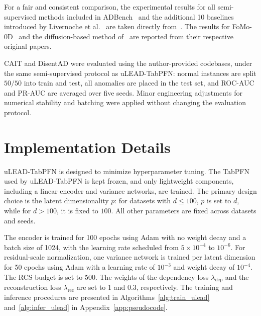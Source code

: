 \documentclass[conference]{IEEEtran}
\begin{document}
	For a fair and consistent comparison, the experimental results for all semi-supervised methods included in ADBench~\cite{han2022adbench} and the additional 10 baselines introduced by Livernoche et al.~\cite{livernochediffusion} are taken directly from~\cite{livernochediffusion}. The results for FoMo-0D~\cite{fomo0d2024zeroshoot} and the diffusion-based method of~\cite{sattarov2025diffusion} are reported from their respective original papers.

	CAIT and DisentAD were evaluated using the author-provided codebases, under the same semi-supervised protocol as uLEAD-TabPFN: normal instances are split $50/50$ into train and test, all anomalies are placed in the test set, and ROC-AUC and PR-AUC are averaged over five seeds. Minor engineering adjustments for numerical stability and batching were applied without changing the evaluation protocol.

	\section{Implementation Details}
	\label{app:implementation}
	
	uLEAD-TabPFN is designed to minimize hyperparameter tuning. The TabPFN used by uLEAD-TabPFN is kept frozen, and only lightweight components, including a linear encoder and variance networks, are trained. The primary design choice is the latent dimensionality $p$: for datasets with $d \leq 100$, $p$ is set to $d$, while for $d > 100$, it is fixed to $100$. All other parameters are fixed across datasets and seeds.
	
	The encoder is trained for 100 epochs using Adam with no weight decay and a batch size of 1024, with the learning rate scheduled from $5\times10^{-4}$ to $10^{-6}$.
	For residual-scale normalization, one variance network is trained per latent dimension for 50 epochs using Adam with a learning rate of $10^{-3}$ and weight decay of $10^{-4}$.
	The RCS budget is set to 500. 
	The weights of the dependency loss $\lambda_{\mathrm{dep}}$ and the reconstruction loss $\lambda_{\mathrm{rec}}$ are set to 1 and 0.3, respectively.
	The training and inference procedures are presented in Algorithms~\ref{alg:train_ulead} and~\ref{alg:infer_ulead} in Appendix~\ref{app:pseudocode}.

\end{document}
